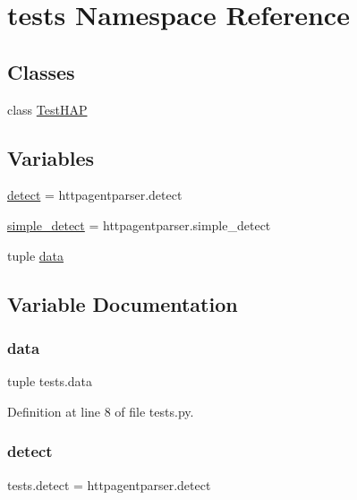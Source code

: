 \hypertarget{namespacetests}{}\section{tests Namespace Reference}
\label{namespacetests}
\subsection*{Classes}
\begin{DoxyCompactItemize}
\item 
class \hyperlink{classtests_1_1_test_h_a_p}{Test\+H\+AP}
\end{DoxyCompactItemize}
\subsection*{Variables}
\begin{DoxyCompactItemize}
\item 
\hyperlink{namespacetests_aae8614438a21a682b82e27c5f1971d38}{detect} = httpagentparser.\+detect
\item 
\hyperlink{namespacetests_a349a0d1c213c5df3fe24efe9444bd570}{simple\+\_\+detect} = httpagentparser.\+simple\+\_\+detect
\item 
tuple \hyperlink{namespacetests_ae6f70ccdb62dec4bd8ac8a3826380234}{data}
\end{DoxyCompactItemize}


\subsection{Variable Documentation}
\hypertarget{namespacetests_ae6f70ccdb62dec4bd8ac8a3826380234}{}\label{namespacetests_ae6f70ccdb62dec4bd8ac8a3826380234} 
\subsubsection{\texorpdfstring{data}{data}}
{\footnotesize\ttfamily tuple tests.\+data}



Definition at line 8 of file tests.\+py.

\hypertarget{namespacetests_aae8614438a21a682b82e27c5f1971d38}{}\label{namespacetests_aae8614438a21a682b82e27c5f1971d38} 
\subsubsection{\texorpdfstring{detect}{detect}}
{\footnotesize\ttfamily tests.\+detect = httpagentparser.\+detect}



